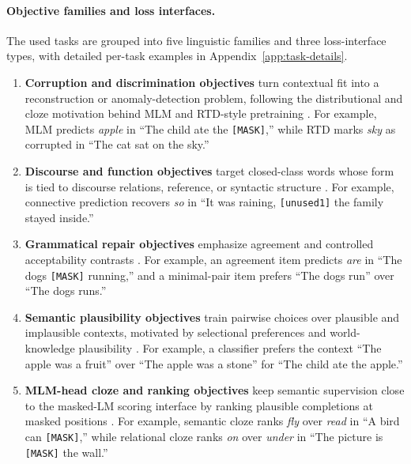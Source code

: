 \documentclass[11pt]{article}
\begin{document}
\paragraph{Objective families and loss interfaces.}
The used tasks are grouped into five linguistic families and three loss-interface types, with detailed per-task examples in Appendix~\ref{app:task-details}.
\begin{enumerate}
  \item \textbf{Corruption and discrimination objectives} turn contextual fit into a reconstruction or anomaly-detection problem, following the distributional and cloze motivation behind MLM \citep{harris1954distributional,taylor1953cloze,devlin2019bert} and RTD-style pretraining \citep{clark2020electra}. For example, MLM predicts \textit{apple} in ``The child ate the \texttt{[MASK]},'' while RTD marks \textit{sky} as corrupted in ``The cat sat on the sky.''
  \item \textbf{Discourse and function objectives} target closed-class words whose form is tied to discourse relations, reference, or syntactic structure \citep{halliday1976cohesion,prasad2008pdtb,gundel1993cognitive,fries1952structure}. For example, connective prediction recovers \textit{so} in ``It was raining, \texttt{[unused1]} the family stayed inside.''
  \item \textbf{Grammatical repair objectives} emphasize agreement and controlled acceptability contrasts \citep{corbett2006agreement,chomsky1957syntactic,warstadt2020blimp}. For example, an agreement item predicts \textit{are} in ``The dogs \texttt{[MASK]} running,'' and a minimal-pair item prefers ``The dogs run'' over ``The dogs runs.''
  \item \textbf{Semantic plausibility objectives} train pairwise choices over plausible and implausible contexts, motivated by selectional preferences and world-knowledge plausibility \citep{resnik1996selectional,ivanova2025ewok}. For example, a classifier prefers the context ``The apple was a fruit'' over ``The apple was a stone'' for ``The child ate the apple.''
  \item \textbf{MLM-head cloze and ranking objectives} keep semantic supervision close to the masked-LM scoring interface by ranking plausible completions at masked positions \citep{salazar2020masked}. For example, semantic cloze ranks \textit{fly} over \textit{read} in ``A bird can \texttt{[MASK]},'' while relational cloze ranks \textit{on} over \textit{under} in ``The picture is \texttt{[MASK]} the wall.''
\end{enumerate}
\end{document}
